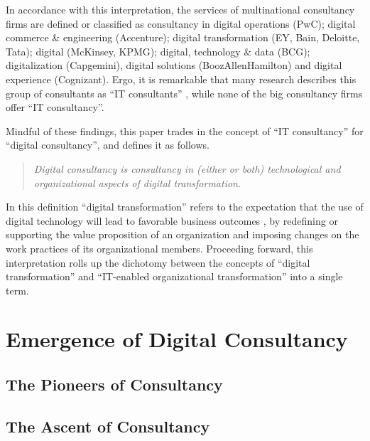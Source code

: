 \documentclass[12pt]{article}
\begin{document}
In accordance with this interpretation, the services of multinational
consultancy firms are defined or classified as consultancy in digital
operations (PwC); digital commerce \& engineering (Accenture); digital
transformation (EY, Bain, Deloitte, Tata); digital (McKinsey, KPMG);
digital, technology \& data (BCG); digitalization (Capgemini), digital
solutions (BoozAllenHamilton) and digital experience (Cognizant). Ergo,
it is remarkable that many research describes this group of consultants
as ``IT consultants''
\citep{nevo2007, loh1992, fincham2006, armbruster2006, bloomfield1995, schwarz2005},
while none of the big consultancy firms offer ``IT consultancy''.

Mindful of these findings, this paper trades in the concept of ``IT
consultancy'' for ``digital consultancy'', and defines it as follows.

\begin{quote}
\emph{Digital consultancy is consultancy in (either or both)
technological and organizational aspects of digital transformation}.
\end{quote}

In this definition ``digital transformation'' refers to the expectation
that the use of digital technology will lead to favorable business
outcomes \citep[ 104-118]{wessel2020}, by redefining or supporting the
value proposition of an organization and imposing changes on the work
practices of its organizational members. Proceeding forward, this
interpretation rolls up the dichotomy between the concepts of ``digital
transformation'' and ``IT-enabled organizational transformation'' into a
single term.

\hypertarget{emergence-of-digital-consultancy}{%
\section{Emergence of Digital
Consultancy}\label{emergence-of-digital-consultancy}}

\hypertarget{the-pioneers-of-consultancy}{%
\subsection{The Pioneers of
Consultancy}\label{the-pioneers-of-consultancy}}

\hypertarget{the-ascent-of-consultancy}{%
\subsection{The Ascent of Consultancy}\label{the-ascent-of-consultancy}}
\end{document}
